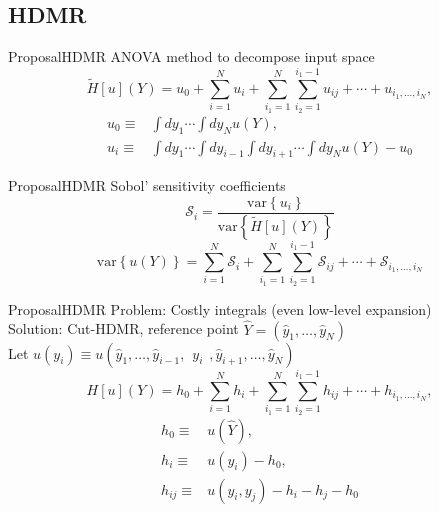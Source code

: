 \documentclass{beamer}
\begin{document}
\subsection{HDMR}
\begin{frame}{Proposal}{HDMR}\vspace{-20pt}
  ANOVA method to decompose input space
  \begin{equation*}
  \tilde H[u](Y) = u_0 + \sum_{i=1}^N u_i + \sum_{i_1=1}^N\sum_{i_2=1}^{i_1-1}u_{ij}+\cdots +
      u_{i_1,\ldots,i_N},
  \end{equation*}
  \begin{align*}
    u_0 \equiv& \int dy_1\cdots\int dy_N u(Y), \\
    u_i \equiv& \int dy_1\cdots\int dy_{i-1}\int dy_{i+1}\cdots\int dy_N u(Y) - u_0
  \end{align*}
\end{frame}

\begin{frame}{Proposal}{HDMR}\vspace{-20pt}
  Sobol' sensitivity coefficients
  \begin{equation*}
    \mathcal{S}_i = \frac{\text{var}\left\{u_i\right\}}{\text{var}\left\{\tilde H[u](Y)\right\}}
  \end{equation*}
  \begin{equation*}
    \text{var}\left\{u(Y)\right\}= \sum_{i=1}^N \mathcal{S}_i + \sum_{i_1=1}^N\sum_{i_2=1}^{i_1-1}
    \mathcal{S}_{ij}+\cdots+\mathcal{S}_{i_1,\ldots,i_N}
  \end{equation*}
\end{frame}

\begin{frame}{Proposal}{HDMR}%
  Problem: Costly integrals (even low-level expansion)\\
  Solution: Cut-HDMR, reference point $\hat Y=(\hat y_1,\ldots,\hat y_N)$\\
  Let $u(y_i) \equiv u(\hat y_1,\ldots,\hat y_{i-1},\hspace{5pt}y_i\hspace{5pt},\hat y_{i+1},\ldots,\hat y_N)$
  \begin{equation*}
  H[u](Y) = h_0 + \sum_{i=1}^N h_i + \sum_{i_1=1}^N\sum_{i_2=1}^{i_1-1}h_{ij}+\cdots +
      h_{i_1,\ldots,i_N},
  \end{equation*}
  \begin{align*}
    h_0 \equiv& u(\hat Y), \\
    h_i \equiv& u(y_i) - h_0, \\
    h_{ij} \equiv& u(y_i,y_j) -h_i - h_j - h_0
  \end{align*}
\end{frame}
\end{document}
